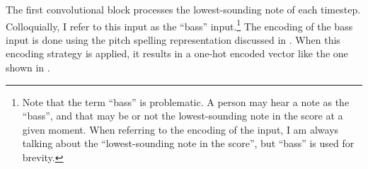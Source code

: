 
The first convolutional block processes the lowest-sounding
note of each timestep. Colloquially, I refer to this input
as the ``bass'' input.\footnote{Note that the term ``bass''
is problematic. A person may hear a note as the ``bass'',
and that may be or not the lowest-sounding note in the score
at a given moment. When referring to the encoding of the
input, I am always talking about the ``lowest-sounding note
in the score'', but ``bass'' is used for brevity.} The
encoding of the bass input is done using the pitch spelling
representation discussed in
. When this encoding
strategy is applied, it results in a one-hot encoded vector
like the one shown in .

